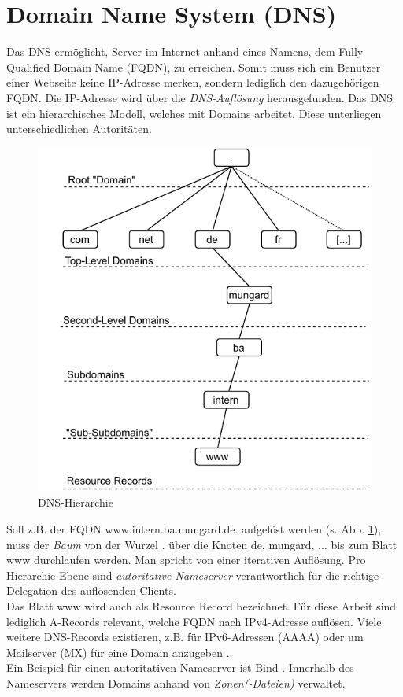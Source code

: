 \section{Domain Name System (DNS)}\label{DNS}
Das \gls{DNS} ermöglicht, Server im Internet anhand eines Namens, dem Fully Qualified Domain Name (\gls{FQDN}), zu erreichen. Somit muss sich ein Benutzer einer Webseite keine IP-Adresse merken, sondern lediglich den dazugehörigen \gls{FQDN}. Die IP-Adresse wird über die \textit{DNS-Auflösung} herausgefunden. Das \gls{DNS} ist ein hierarchisches Modell, welches mit Domains arbeitet. Diese unterliegen unterschiedlichen Autoritäten. 
\begin{figure}[h]
  \centering
  \includegraphics{Figures/dns_autoritative.pdf}
  \caption{DNS-Hierarchie}
  \label{grafik: dns-hierarchy}
\end{figure}\FloatBarrier

Soll z.B. der \gls{FQDN} www.intern.ba.mungard.de. aufgelöst werden (s. Abb. \ref{grafik: dns-hierarchy}), muss der \textit{Baum} von der Wurzel \glqq .\grqq{} über die Knoten \glqq de\grqq{}, \glqq mungard\grqq{}, ... bis zum Blatt \glqq www\grqq{} durchlaufen werden. Man spricht von einer iterativen Auflösung. Pro Hierarchie-Ebene sind \textit{autoritative Nameserver} verantwortlich für die richtige Delegation des auflösenden \gls{Client}s.\\
Das Blatt \glqq www\grqq{} wird auch als Resource Record bezeichnet. Für diese Arbeit sind lediglich A-Records relevant, welche \gls{FQDN} nach IPv4-Adresse auflösen. Viele weitere \gls{DNS}-Records existieren, z.B. für IPv6-Adressen (AAAA) oder um Mailserver (MX) für eine Domain anzugeben \cite[S.528]{Fall2011}.\\
Ein Beispiel für einen autoritativen Nameserver ist Bind \cite{liu2006dns}. Innerhalb des Nameservers werden Domains anhand von \textit{Zonen(-Dateien)} verwaltet.
\newpage
